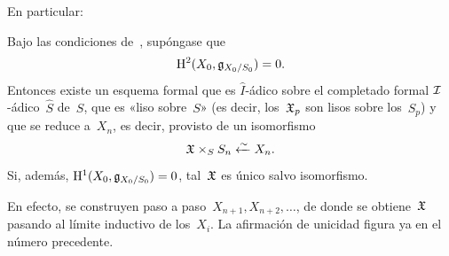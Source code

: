 En particular:

\begin{corollaire}
\label{III.6.10}
Bajo las condiciones de~, supóngase que
$$
\H^2(X_0,\goth{g}_{X_0/S_0})=0.
$$
Entonces existe un esquema formal
que es $\hat I$-ádico sobre el completado formal $\cal{I}$-ádico~$\hat{S}$ de~$S$, que es «liso sobre~$S$» (es decir, los~$\goth{X}_p$ son lisos sobre los~$S_p$) y que se reduce a~$X_n$, es decir, provisto de un isomorfismo
$$
\goth{X}\times_S S_n\isomfrom X_n.
$$
Si, además, $\H^1(X_0,\goth{g}_{X_0/S_0})=0$, tal~$\goth{X}$ es único salvo isomorfismo.
\end{corollaire}

En efecto, se construyen paso a paso~$X_{n+1},X_{n+2},\dots$, de donde se obtiene~$\goth{X}$ pasando al límite inductivo de los~$X_i$. La afirmación de unicidad figura ya en el número precedente.

